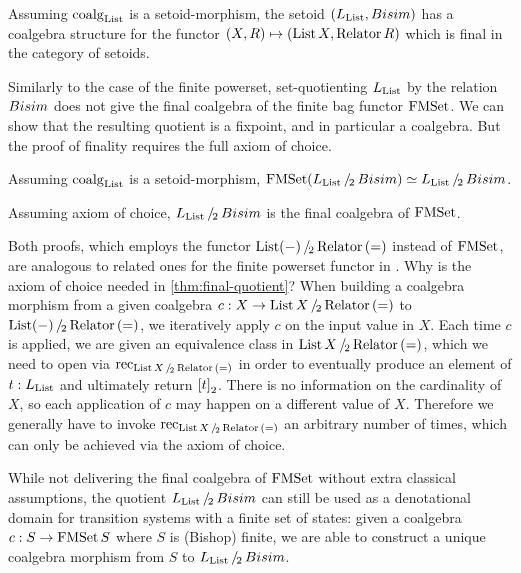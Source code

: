 \documentclass[a4paper,USenglish,cleveref]{lipics-v2021}
\begin{document}
\begin{theorem}\label{thm:final-setoids}
  Assuming $\coalg{\List}$ is a setoid-morphism,
  the setoid $(\Lim{\List},\Bisim)$ has a coalgebra structure for the functor
  $(X, R) \mapsto (\List X, \Relator R)$
  which is final in the category of setoids.
\end{theorem}

Similarly to the case of the finite powerset, set-quotienting $\Lim{\List}$ by the relation $\Bisim$ does not give the final coalgebra of the finite bag functor $\FMSet$. We can show that the resulting quotient is a fixpoint, and in particular a coalgebra. But the proof of finality requires the full axiom of choice. 
\begin{theorem}\label{thm:fixpoint-quotient}
  Assuming $\coalg{\List}$ is a setoid-morphism,
  $\FMSet(\SetQuot[\Lim{\List}][\Bisim]) \simeq \SetQuot[\Lim{\List}][\Bisim]$.
\end{theorem}
\begin{theorem}\label{thm:final-quotient}
  Assuming axiom of choice, $\SetQuot[\Lim{\List}][\Bisim]$ is the final coalgebra of $\FMSet$.
\end{theorem}
Both proofs, which employs the functor $\SetQuot[\List (-)][\Relator\,(=)]$ instead of $\FMSet$, are analogous to related ones for the finite powerset functor in \cite{Veltri2021}.
Why is the axiom of choice needed in \cref{thm:final-quotient}? When building a coalgebra morphism from a given coalgebra $c : X \to \SetQuot[\List X][\Relator\,(=)]$ to $\SetQuot[\List (-)][\Relator\,(=)]$, we iteratively apply $c$ on the input value in $X$. Each time $c$ is applied, we are given an equivalence class in $\SetQuot[\List X][\Relator\,(=)]$, which we need to open via $\Rec{\SetQuot[\List X][\Relator\,(=)]}$ in order to eventually produce an element of $t : \Lim{\List}$ and ultimately return $\SetQuotCon[t]$. There is no information on the
cardinality of $X$, so each application of $c$ may happen on a different
value of $X$. Therefore we generally have to invoke $\Rec{\SetQuot[\List X][\Relator\,(=)]}$ an arbitrary number of times,
which can only be achieved via the axiom of choice.


While not delivering the final coalgebra of $\FMSet$ without extra classical assumptions, the quotient $\SetQuot[\Lim{\List}][\Bisim]$ can still be used as a denotational domain for transition systems with a finite set of states: given a coalgebra $c : S \to \FMSet S$ where $S$ is (Bishop) finite, we are able to construct a unique coalgebra morphism from $S$ to $\SetQuot[\Lim{\List}][\Bisim]$.
\end{document}
